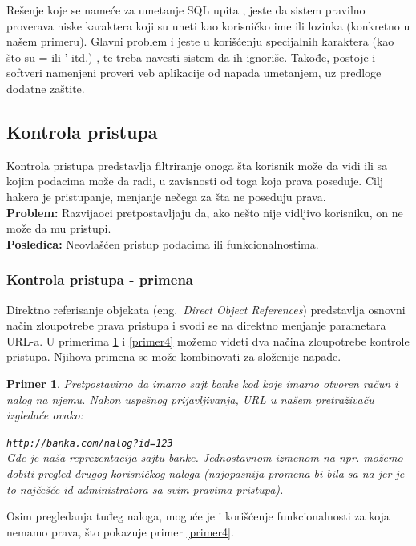 \documentclass[a4paper]{article}
\newtheorem{primer}{Primer}[section]
\begin{document}
Rešenje koje se nameće za umetanje SQL upita \cite{SQL_prev}, jeste da sistem pravilno proverava niske karaktera koji su uneti kao korisničko ime ili lozinka (konkretno u našem primeru). Glavni problem i jeste u korišćenju specijalnih karaktera (kao što su = ili ' itd.) \cite{Sanit} , te treba navesti sistem da ih ignoriše. Takođe, postoje i softveri namenjeni proveri  veb aplikacije od napada umetanjem, uz predloge dodatne zaštite.

\subsection{Kontrola pristupa}

Kontrola pristupa \cite{AC} predstavlja filtriranje onoga šta korisnik može da vidi ili sa kojim podacima može da radi,  u zavisnosti od toga koja prava poseduje. Cilj hakera je pristupanje, menjanje nečega za šta ne poseduju prava.\\
\textbf{Problem:} Razvijaoci pretpostavljaju da, ako nešto nije vidljivo korisniku, on ne može da mu pristupi.\\
\textbf{Posledica:} Neovlašćen pristup podacima ili funkcionalnostima.

\subsubsection{Kontrola pristupa - primena}

Direktno referisanje objekata (eng.~{\em Direct Object References}) predstavlja osnovni način zloupotrebe prava pristupa i svodi se na direktno menjanje parametara URL-a. U primerima \ref{primer3} i \ref{primer4} možemo videti dva načina zloupotrebe kontrole pristupa. Njihova primena se može kombinovati za složenije napade.
\begin{primer}
\label{primer3}
Pretpostavimo da imamo sajt banke kod koje imamo otvoren račun i nalog na njemu. Nakon uspešnog prijavljivanja, URL u našem pretraživaču izgledaće ovako:

\texttt{http://banka.com/nalog?id=123}\\
Gde je  naša reprezentacija sajtu banke. Jednostavnom izmenom  na npr.  možemo dobiti pregled drugog korisničkog naloga (najopasnija promena bi bila sa  na  jer je to najčešće id administratora sa svim pravima pristupa).
\end{primer}
Osim pregledanja tuđeg naloga, moguće je i korišćenje funkcionalnosti za koja nemamo prava, što pokazuje primer \ref{primer4}.
\end{document}
